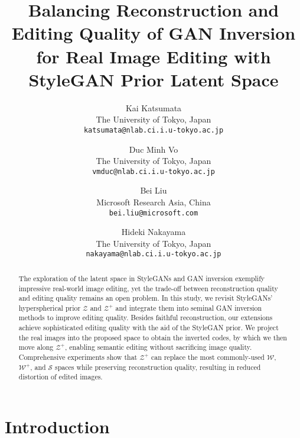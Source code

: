 \documentclass[10pt,twocolumn,letterpaper]{article}
\newcommand{\WS}{\mathcal{W}}
\newcommand{\WPS}{\mathcal{W}^{+}}
\newcommand{\ZS}{\mathcal{Z}}
\newcommand{\ZPS}{\mathcal{Z}^{+}}
\newcommand{\SSp}{\mathcal{S}}
\begin{document}
\title{Balancing Reconstruction and Editing Quality of GAN Inversion \\ for Real Image Editing with StyleGAN Prior Latent Space}

\author{Kai Katsumata\\
The University of Tokyo, Japan\\
{\tt\small katsumata@nlab.ci.i.u-tokyo.ac.jp}\\
\and
Duc Minh Vo\\
The University of Tokyo, Japan\\
{\tt\small vmduc@nlab.ci.i.u-tokyo.ac.jp}\\
\and
Bei Liu\\
Microsoft Research Asia, China\\
{\tt\small bei.liu@microsoft.com}\\
\and
Hideki Nakayama\\
The University of Tokyo, Japan\\
{\tt\small nakayama@nlab.ci.i.u-tokyo.ac.jp}\\
}

\maketitle


\begin{abstract}
The exploration of the latent space in StyleGANs and GAN inversion exemplify impressive real-world image editing, yet the trade-off between reconstruction quality and editing quality remains an open problem.
In this study, we revisit StyleGANs' hyperspherical prior $\ZS$ and $\ZPS$ and 
integrate them into seminal GAN inversion methods to improve editing quality. Besides faithful reconstruction, our extensions achieve sophisticated editing quality with the aid of the StyleGAN prior.
We project the real images into the proposed space to obtain the inverted codes, by which we then move along $\ZPS$, enabling semantic editing without sacrificing image quality.
Comprehensive experiments 
show that $\ZPS$ can replace the most commonly-used $\WS$, $\WPS$, and $\SSp$ spaces while preserving reconstruction quality, 
resulting in reduced distortion of edited images.

\end{abstract}

\section{Introduction}
\label{sec:intro}
    
\end{document}
